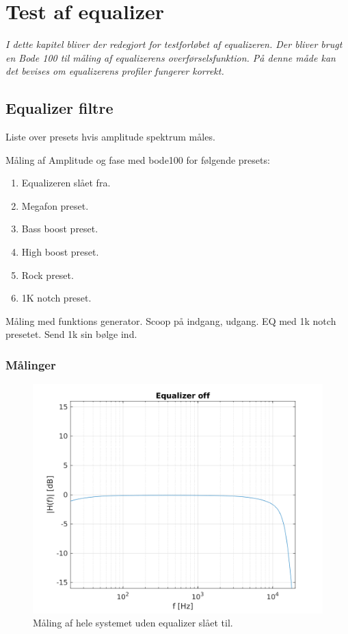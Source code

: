 \chapter{Test af equalizer}\label{sec:test_eq}




\emph{I dette kapitel bliver der redegjort for testforløbet af equalizeren. Der bliver brugt en Bode 100 til måling af equalizerens overførselsfunktion. På denne måde kan det bevises om equalizerens profiler fungerer korrekt.}

\section{Equalizer filtre}


Liste over presets hvis amplitude spektrum måles.

Måling af Amplitude og fase med bode100 for følgende presets:
\begin{enumerate}
    \item Equalizeren slået fra.
    \item Megafon preset.
    \item Bass boost preset.
    \item High boost preset.
    \item Rock preset. 
    \item 1K notch preset.
\end{enumerate}

Måling med funktions generator. Scoop på indgang, udgang.
EQ med 1k notch presetet. 
Send 1k sin bølge ind. 


\subsection{Målinger}


\begin{figure}[h]
\centering
\includegraphics[]{matlabdemo/test/eq_off.png}  
\caption{Måling af hele systemet uden equalizer slået til.}
\end{figure}


